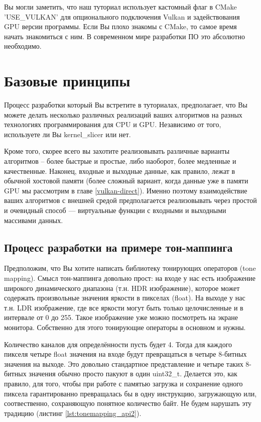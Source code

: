 \documentclass[11pt,fleqn,english,russian]{report} %
\begin{document}
\begin{remark} 
Вы могли заметить, что наш туториал использует кастомный флаг в CMake 'USE\_VULKAN' для опционального подключения Vulkan и задействования GPU версии программы. Если Вы плохо знакомы с CMake, то самое время начать знакомиться с ним. В современном мире разработки ПО это абсолютно необходимо. 
\end{remark}

\chapter{Базовые принципы}

Процесс разработки который Вы встретите в туториалах, предполагает, что Вы можете делать несколько различных реализаций ваших алгоритмов на разных технологиях программирования для CPU и GPU. Независимо от того, используете ли Вы kernel\_slicer или нет. 

Кроме того, скорее всего вы захотите реализовывать различные варианты алгоритмов -- более быстрые и простые, либо наоборот, более медленные и качественные. Наконец, входные и выходные данные, как правило, лежат в обычной хостовой памяти (более сложный вариант, когда данные уже в памяти GPU мы рассмотрим в главе \ref{vulkan-direct}). Именно поэтому взаимодействие ваших алгоритмов с внешней средой предполагается реализовывать через простой и очевидный способ --- виртуальные функции с входными и выходными массивами данных. 

\section{Процесс разработки на примере тон-маппинга}\label{tm_example}

Предположим, что Вы хотите написать библиотеку тонирующих операторов (tone mapping). Смысл тон-маппинга довольно прост: на входе у нас есть изображение широкого динамического диапазона (т.н. HDR изображение), которое может содержать произвольные значения яркости в пикселах (float). На выходе у нас т.н. LDR изображение, где все яркости могут быть только целочисленные и в интервале от 0 до 255. Такое изображение уже можно посмотреть на экране монитора. Собственно для этого тонирующие операторы в основном и нужны.

Количество каналов для определённости пусть будет 4. Тогда для каждого пикселя четыре float значения на входе будут превращаться в четыре 8-битных значения на выходе. Это довольно стандартное представление и четыре таких 8-битных значения обычно просто пакуют в один uint32\_t. Делается это, как правило, для того, чтобы при работе с памятью загрузка и сохранение одного пиксела гарантированно превращалась бы в одну инструкцию, загружающую или, соотвественно, сохраняющую понятное количество байт. Не будем нарушать эту традицию (листинг \ref{lst:tonemapping_api2}).
\end{document}
